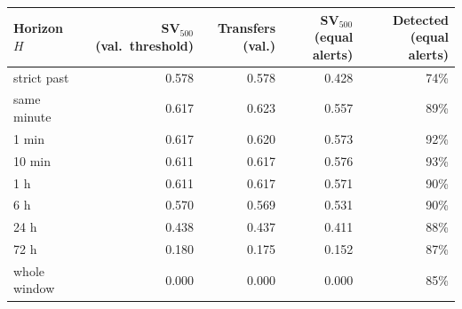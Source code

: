\begin{tabular}{lrrrr}
\toprule
Horizon $H$ & SV$_{500}$ (val.\ threshold) & Transfers (val.) & SV$_{500}$ (equal alerts) & Detected (equal alerts) \\
\midrule
strict past & 0.578 & 0.578 & 0.428 & 74\% \\
same minute & 0.617 & 0.623 & 0.557 & 89\% \\
1 min & 0.617 & 0.620 & 0.573 & 92\% \\
10 min & 0.611 & 0.617 & 0.576 & 93\% \\
1 h & 0.611 & 0.617 & 0.571 & 90\% \\
6 h & 0.570 & 0.569 & 0.531 & 90\% \\
24 h & 0.438 & 0.437 & 0.411 & 88\% \\
72 h & 0.180 & 0.175 & 0.152 & 87\% \\
whole window & 0.000 & 0.000 & 0.000 & 85\% \\
\bottomrule
\end{tabular}